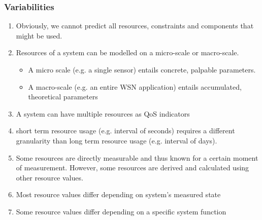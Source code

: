 \subsubsection{Variabilities}
\begin{enumerate}[label=V\rdmid .\arabic*]
\item \label{v:obvious} Obviously, we cannot predict all resources, constraints and components that might be used.
\item \label{v:micr_macro} Resources of a system can be modelled on a micro-scale or macro-scale.
\begin{itemize}
\item A micro scale (e.g. a single sensor) entails concrete, palpable parameters.
\item A macro-scale (e.g. an entire WSN application) entails accumulated, theoretical parameters
\end{itemize}
\item \label{v:nr_optimizer} A system can have multiple resources as QoS indicators
\item \label{v:granularity} short term resource usage (e.g. interval of seconds) requires a different granularity than long term resource usage (e.g. interval of days).
\item \label{v:measure_vs_derive} Some resources are directly measurable and thus known for a certain moment of measurement. However, some resources are derived and calculated using other resource values. \cite{feature_model}
\item \label{v:state} Most resource values differ depending on system's measured state
\item \label{v:function} Some resource values differ depending on a specific system function
\end{enumerate}

